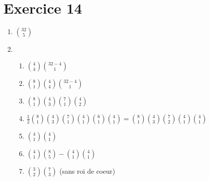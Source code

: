 \documentclass[../main.tex]{subfiles}
\begin{document}
\section*{Exercice 14}
\begin{enumerate}
    \item $\binom{32}{5}$
    \item \begin{enumerate}
        \item $\binom{4}{4}\binom{32-4}{1}$
        \item $\binom{8}{1}\binom{4}{4}\binom{32-4}{1}$
        \item $\binom{8}{1}\binom{4}{3}\binom{7}{1}\binom{4}{2}$
        \item $\frac{1}{2}\binom{8}{1}\binom{4}{3}\binom{7}{1}\binom{4}{1}\binom{6}{1}\binom{4}{1} = \binom{8}{1}\binom{4}{3}\binom{7}{2}\binom{4}{1}\binom{4}{1}$
        \item $\binom{4}{1}\binom{4}{1}$
        \item $\binom{4}{1}\binom{8}{5} - \binom{4}{1}\binom{4}{1}$
        \item $\binom{3}{2}\binom{7}{3}$ (sans roi de coeur)
    \end{enumerate}
\end{enumerate}
\end{document}
